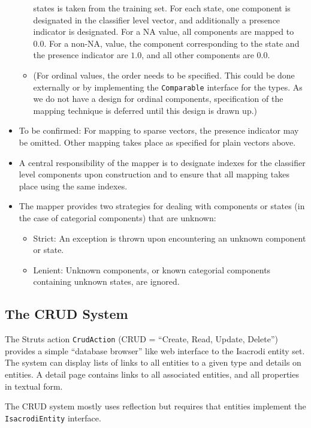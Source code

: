 \documentclass[a4paper,fleqn]{article}
\newcommand{\computercode}[1]{\texttt{#1}}
\begin{document}
\begin{itemize}
\begin{itemize}
    states is taken from the training set. For each state, one
    component is designated in the classifier level vector, and
    additionally a presence indicator is designated. For a NA value,
    all components are mapped to $0.0$. For a non-NA, value, the
    component corresponding to the state and the presence indicator
    are $1.0$, and all other components are $0.0$.
  \item (For ordinal values, the order needs to be specified. This
    could be done externally or by implementing the
    \computercode{Comparable} interface for the types. As we do not
    have a design for ordinal components, specification of the mapping
    technique is deferred until this design is drawn up.)
  \end{itemize}
\item To be confirmed: For mapping to sparse vectors, the presence
  indicator may be omitted. Other mapping takes place as specified for
  plain vectors above.
\item A central responsibility of the mapper is to designate indexes
  for the classifier level components upon construction and to ensure
  that all mapping takes place using the same indexes.
\item The mapper provides two strategies for dealing with components
  or states (in the case of categorial components) that are unknown:
  \begin{itemize}
  \item Strict: An exception is thrown upon encountering an unknown
    component or state.
  \item Lenient: Unknown components, or known categorial components
    containing unknown states, are ignored.
  \end{itemize}
\end{itemize}


\subsection{The CRUD System}

The Struts action \computercode{CrudAction} (CRUD = ``Create, Read,
Update, Delete'') provides a simple ``database browser'' like web
interface to the Isacrodi entity set. The system can display lists of
links to all entities to a given type and details on entities. A
detail page contains links to all associated entities, and all
properties in textual form.

The CRUD system mostly uses reflection but requires that entities
implement the \computercode{IsacrodiEntity} interface.
\end{document}
